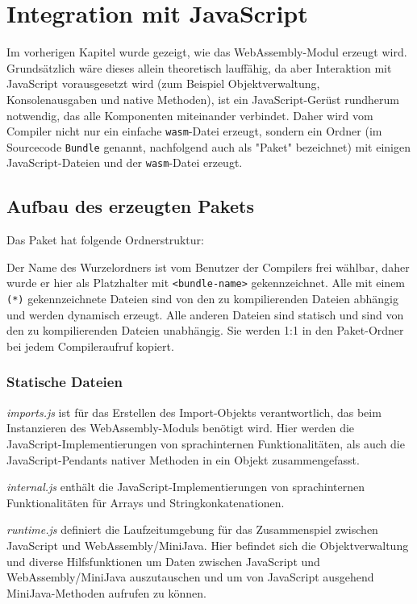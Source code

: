 \chapter{Integration mit JavaScript}

Im vorherigen Kapitel wurde gezeigt, wie das WebAssembly-Modul erzeugt wird. Grundsätzlich wäre dieses allein theoretisch lauffähig, da aber Interaktion mit JavaScript vorausgesetzt wird (zum Beispiel Objektverwaltung, Konsolenausgaben und native Methoden), ist ein JavaScript-Gerüst rundherum notwendig, das alle Komponenten miteinander verbindet. Daher wird vom Compiler nicht nur ein einfache \lstinline{wasm}-Datei erzeugt, sondern ein Ordner (im Sourcecode \lstinline{Bundle} genannt, nachfolgend auch als "Paket" bezeichnet) mit einigen JavaScript-Dateien und der \lstinline{wasm}-Datei erzeugt.

\section{Aufbau des erzeugten Pakets}

Das Paket hat folgende Ordnerstruktur:


Der Name des Wurzelordners ist vom Benutzer der Compilers frei wählbar, daher wurde er hier als Platzhalter mit \lstinline{<bundle-name>} gekennzeichnet. Alle mit einem \lstinline{(*)} gekennzeichnete Dateien sind von den zu kompilierenden Dateien abhängig und werden dynamisch erzeugt. Alle anderen Dateien sind statisch und sind von den zu kompilierenden Dateien unabhängig. Sie werden 1:1 in den Paket-Ordner bei jedem Compileraufruf kopiert.

\subsection{Statische Dateien}

\emph{imports.js} ist für das Erstellen des Import-Objekts verantwortlich, das beim Instanzieren des WebAssembly-Moduls benötigt wird. Hier werden die JavaScript-Implementie\-rungen von sprachinternen Funktionalitäten, als auch die JavaScript-Pendants nativer Methoden in ein Objekt zusammengefasst.

\emph{internal.js} enthält die JavaScript-Implementierungen von sprachinternen Funktionalitäten für Arrays und Stringkonkatenationen.

\emph{runtime.js} definiert die Laufzeitumgebung für das Zusammenspiel zwischen JavaScript und WebAssembly/MiniJava. Hier befindet sich die Objektverwaltung und diverse Hilfsfunktionen um Daten zwischen JavaScript und WebAssembly/MiniJava auszutauschen und um von JavaScript ausgehend MiniJava-Methoden aufrufen zu können.

